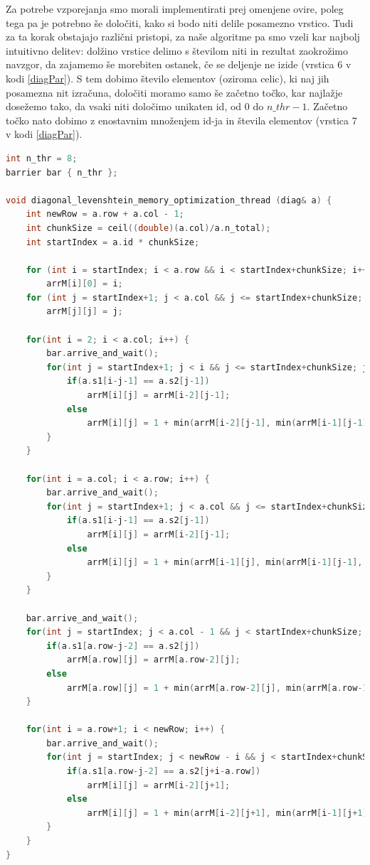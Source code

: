 \documentclass[a4paper,12pt,openright]{book}
\begin{document}
Za potrebe vzporejanja smo morali implementirati prej omenjene ovire, poleg tega pa je potrebno še določiti, kako si bodo niti delile posamezno vrstico. Tudi za ta korak obstajajo različni pristopi, za naše algoritme pa smo vzeli kar najbolj intuitivno delitev: dolžino vrstice delimo s številom niti in rezultat zaokrožimo navzgor, da zajamemo še morebiten ostanek, če se deljenje ne izide (vrstica 6 v kodi \ref{diagPar}). S tem dobimo število elementov (oziroma celic), ki naj jih posamezna nit izračuna, določiti moramo samo še začetno točko, kar najlažje dosežemo tako, da vsaki niti določimo unikaten id, od 0 do $n\_thr-1$. Začetno točko nato dobimo z enostavnim množenjem id-ja in števila elementov (vrstica 7 v kodi \ref{diagPar}). 

\bigskip
\bigskip

\begin{lstlisting}[language=C++, caption={Vzporedni diagonalni algoritem za računanje Levenshteinove razdalje.}, captionpos=b, label=diagPar]
int n_thr = 8;
barrier bar { n_thr };

void diagonal_levenshtein_memory_optimization_thread (diag& a) {
    int newRow = a.row + a.col - 1;
    int chunkSize = ceil((double)(a.col)/a.n_total);
    int startIndex = a.id * chunkSize;

    for (int i = startIndex; i < a.row && i < startIndex+chunkSize; i++)
        arrM[i][0] = i;
    for (int j = startIndex+1; j < a.col && j <= startIndex+chunkSize; j++)
        arrM[j][j] = j;

    for(int i = 2; i < a.col; i++) {
        bar.arrive_and_wait();
        for(int j = startIndex+1; j < i && j <= startIndex+chunkSize; j++) {
            if(a.s1[i-j-1] == a.s2[j-1])
                arrM[i][j] = arrM[i-2][j-1];
            else
                arrM[i][j] = 1 + min(arrM[i-2][j-1], min(arrM[i-1][j-1], arrM[i-1][j]));
        }
    }

    for(int i = a.col; i < a.row; i++) {
        bar.arrive_and_wait();
        for(int j = startIndex+1; j < a.col && j <= startIndex+chunkSize; j++) {
            if(a.s1[i-j-1] == a.s2[j-1])
                arrM[i][j] = arrM[i-2][j-1];
            else
                arrM[i][j] = 1 + min(arrM[i-1][j], min(arrM[i-1][j-1], arrM[i-2][j-1]));
        }
    }

    bar.arrive_and_wait();
    for(int j = startIndex; j < a.col - 1 && j < startIndex+chunkSize; j++) {
        if(a.s1[a.row-j-2] == a.s2[j])
            arrM[a.row][j] = arrM[a.row-2][j];
        else
            arrM[a.row][j] = 1 + min(arrM[a.row-2][j], min(arrM[a.row-1][j+1], arrM[a.row-1][j]));
    }
    
    for(int i = a.row+1; i < newRow; i++) {
        bar.arrive_and_wait();
        for(int j = startIndex; j < newRow - i && j < startIndex+chunkSize; j++) {
            if(a.s1[a.row-j-2] == a.s2[j+i-a.row])
                arrM[i][j] = arrM[i-2][j+1];
            else
                arrM[i][j] = 1 + min(arrM[i-2][j+1], min(arrM[i-1][j+1], arrM[i-1][j]));
        }
    }
}
        \end{lstlisting}
\end{document}
